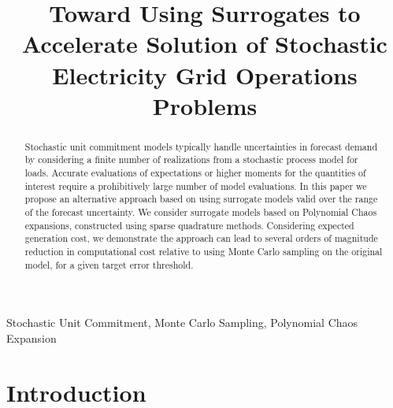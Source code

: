 \documentclass[conference]{IEEEtran}
\begin{document}
\title{Toward Using Surrogates to Accelerate Solution of Stochastic Electricity Grid Operations Problems}
\author{
\and 
{} 
}

\maketitle

\begin{abstract}
Stochastic unit commitment models typically handle uncertainties in forecast
demand by considering a finite number of realizations from a stochastic process
model for loads. Accurate evaluations of expectations or higher moments for the
quantities of interest require a prohibitively large number of model
evaluations. In this paper we propose an alternative approach based on using
surrogate models valid over the range of the forecast uncertainty. We
consider surrogate models based on Polynomial Chaos expansions, constructed
using sparse quadrature methods. Considering expected generation cost, we 
demonstrate the approach can lead to several orders of magnitude reduction 
in computational cost relative to using Monte Carlo sampling on the original model, 
for a given target error threshold.
\end{abstract}

\begin{IEEEkeywords}
Stochastic Unit Commitment, Monte Carlo Sampling, Polynomial Chaos Expansion
\end{IEEEkeywords}


\IEEEpeerreviewmaketitle

\section{Introduction}
\end{document}
